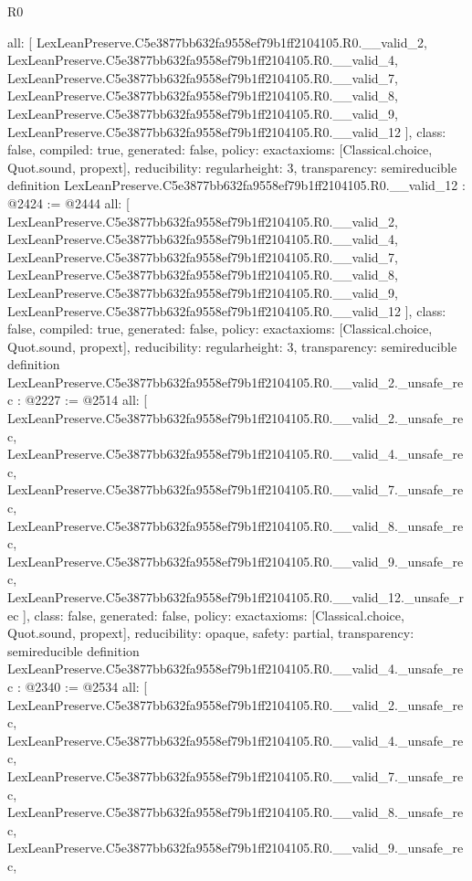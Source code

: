 \begin{lexlean}{R0}
\begin{coremodule}
{  all: [
    LexLeanPreserve.C5e3877bb632fa9558ef79b1ff2104105.R0.__valid_2,
    LexLeanPreserve.C5e3877bb632fa9558ef79b1ff2104105.R0.__valid_4,
    LexLeanPreserve.C5e3877bb632fa9558ef79b1ff2104105.R0.__valid_7,
    LexLeanPreserve.C5e3877bb632fa9558ef79b1ff2104105.R0.__valid_8,
    LexLeanPreserve.C5e3877bb632fa9558ef79b1ff2104105.R0.__valid_9,
    LexLeanPreserve.C5e3877bb632fa9558ef79b1ff2104105.R0.__valid_12
  ],
  class: false,
  compiled: true,
  generated: false,
  policy: exact{axioms: [Classical.choice, Quot.sound, propext]},
  reducibility: regular{height: 3},
  transparency: semireducible
}
definition LexLeanPreserve.C5e3877bb632fa9558ef79b1ff2104105.R0.__valid_12 : @2424 := @2444 {
  all: [
    LexLeanPreserve.C5e3877bb632fa9558ef79b1ff2104105.R0.__valid_2,
    LexLeanPreserve.C5e3877bb632fa9558ef79b1ff2104105.R0.__valid_4,
    LexLeanPreserve.C5e3877bb632fa9558ef79b1ff2104105.R0.__valid_7,
    LexLeanPreserve.C5e3877bb632fa9558ef79b1ff2104105.R0.__valid_8,
    LexLeanPreserve.C5e3877bb632fa9558ef79b1ff2104105.R0.__valid_9,
    LexLeanPreserve.C5e3877bb632fa9558ef79b1ff2104105.R0.__valid_12
  ],
  class: false,
  compiled: true,
  generated: false,
  policy: exact{axioms: [Classical.choice, Quot.sound, propext]},
  reducibility: regular{height: 3},
  transparency: semireducible
}
definition LexLeanPreserve.C5e3877bb632fa9558ef79b1ff2104105.R0.__valid_2._unsafe_rec : @2227 := @2514 {
  all: [
    LexLeanPreserve.C5e3877bb632fa9558ef79b1ff2104105.R0.__valid_2._unsafe_rec,
    LexLeanPreserve.C5e3877bb632fa9558ef79b1ff2104105.R0.__valid_4._unsafe_rec,
    LexLeanPreserve.C5e3877bb632fa9558ef79b1ff2104105.R0.__valid_7._unsafe_rec,
    LexLeanPreserve.C5e3877bb632fa9558ef79b1ff2104105.R0.__valid_8._unsafe_rec,
    LexLeanPreserve.C5e3877bb632fa9558ef79b1ff2104105.R0.__valid_9._unsafe_rec,
    LexLeanPreserve.C5e3877bb632fa9558ef79b1ff2104105.R0.__valid_12._unsafe_rec
  ],
  class: false,
  generated: false,
  policy: exact{axioms: [Classical.choice, Quot.sound, propext]},
  reducibility: opaque{},
  safety: partial,
  transparency: semireducible
}
definition LexLeanPreserve.C5e3877bb632fa9558ef79b1ff2104105.R0.__valid_4._unsafe_rec : @2340 := @2534 {
  all: [
    LexLeanPreserve.C5e3877bb632fa9558ef79b1ff2104105.R0.__valid_2._unsafe_rec,
    LexLeanPreserve.C5e3877bb632fa9558ef79b1ff2104105.R0.__valid_4._unsafe_rec,
    LexLeanPreserve.C5e3877bb632fa9558ef79b1ff2104105.R0.__valid_7._unsafe_rec,
    LexLeanPreserve.C5e3877bb632fa9558ef79b1ff2104105.R0.__valid_8._unsafe_rec,
    LexLeanPreserve.C5e3877bb632fa9558ef79b1ff2104105.R0.__valid_9._unsafe_rec,
}
\end{coremodule}
\end{lexlean}

